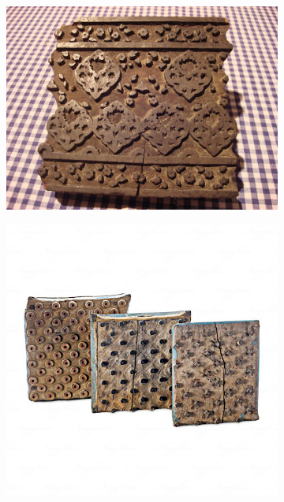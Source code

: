 \documentclass[fontsize=12pt, appendixprefix=true]{scrreprt}
\begin{document}
\begin{figure}[h!]
	\centering
	\begin{subfigure}[b]{0.2\linewidth}
	  \includegraphics[width=\linewidth]{img/fábolkészült02.jpg}
	  \caption{}
	\end{subfigure}
	\begin{subfigure}[b]{0.2\linewidth}
	  \includegraphics[width=\linewidth]{img/fábolkészült 01.png}
	  \caption{}
	\end{subfigure}

\end{figure}
\end{document}
